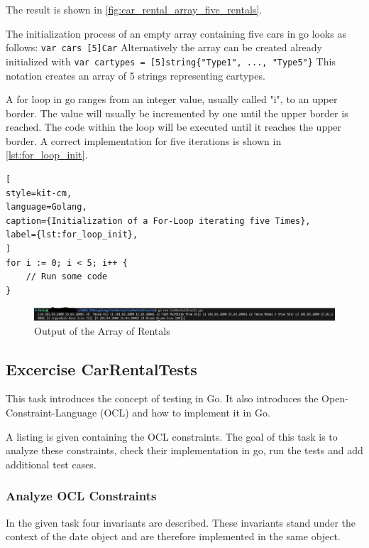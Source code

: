 The result is shown in \autoref{fig:car_rental_array_five_rentals}.

The initialization process of an empty array containing five cars in go looks as follows: \texttt{var cars [5]Car}
Alternatively the array can be created already initialized with \texttt{var cartypes = [5]string\{"Type1", ..., "Type5"\}}
This notation creates an array of 5 strings representing cartypes.

A for loop in go ranges from an integer value, usually called "i", to an upper border.
The value will usually be incremented by one until the upper border is reached. 
The code within the loop will be executed until it reaches the upper border.
A correct implementation for five iterations is shown in \autoref{lst:for_loop_init}.

\begin{lstlisting}[
style=kit-cm,
language=Golang,
caption={Initialization of a For-Loop iterating five Times},
label={lst:for_loop_init},
]
for i := 0; i < 5; i++ {
    // Run some code
}
\end{lstlisting}

\begin{figure}[H]
\centering
\includegraphics[width=\textwidth]{figures/goLang/carRental/carRental_arrayFiveRentals.png}
\caption{Output of the Array of Rentals}
\label{fig:car_rental_array_five_rentals}
\end{figure}

\subsection{Excercise CarRentalTests}
\label{sec:car_rental_tests}
This task introduces the concept of testing in Go.
It also introduces the Open-Constraint-Language (OCL) and how to implement it in Go.

A listing is given containing the OCL constraints.
The goal of this task is to analyze these constraints, check their implementation in go, run the tests and add additional test cases.

\subsubsection*{Analyze OCL Constraints}
In the given task four invariants are described.
These invariants stand under the context of the date object and are therefore implemented in the same object.

